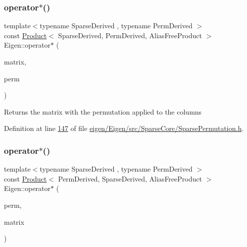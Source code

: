 \subsubsection{\texorpdfstring{operator$\ast$()}{operator*()}\hspace{0.1cm}{\footnotesize\ttfamily [1/9]}}
{\footnotesize\ttfamily template$<$typename Sparse\+Derived , typename Perm\+Derived $>$ \\
const \hyperlink{group___core___module_class_eigen_1_1_product}{Product}$<$ Sparse\+Derived, Perm\+Derived, Alias\+Free\+Product $>$ Eigen\+::operator$\ast$ (\begin{DoxyParamCaption}\item[{const \hyperlink{group___sparse_core___module_class_eigen_1_1_sparse_matrix_base}{Sparse\+Matrix\+Base}$<$ Sparse\+Derived $>$ \&}]{matrix,  }\item[{const \hyperlink{group___core___module_class_eigen_1_1_permutation_base}{Permutation\+Base}$<$ Perm\+Derived $>$ \&}]{perm }\end{DoxyParamCaption})\hspace{0.3cm}{\ttfamily [inline]}}

\begin{DoxyReturn}{Returns}
the matrix with the permutation applied to the columns 
\end{DoxyReturn}


Definition at line \hyperlink{eigen_2_eigen_2src_2_sparse_core_2_sparse_permutation_8h_source_l00147}{147} of file \hyperlink{eigen_2_eigen_2src_2_sparse_core_2_sparse_permutation_8h_source}{eigen/\+Eigen/src/\+Sparse\+Core/\+Sparse\+Permutation.\+h}.

\mbox{\label{namespace_eigen_a9c2c1af8da495ae3cbe7be12cecfe294}} 
\subsubsection{\texorpdfstring{operator$\ast$()}{operator*()}\hspace{0.1cm}{\footnotesize\ttfamily [2/9]}}
{\footnotesize\ttfamily template$<$typename Sparse\+Derived , typename Perm\+Derived $>$ \\
const \hyperlink{group___core___module_class_eigen_1_1_product}{Product}$<$ Perm\+Derived, Sparse\+Derived, Alias\+Free\+Product $>$ Eigen\+::operator$\ast$ (\begin{DoxyParamCaption}\item[{const \hyperlink{group___core___module_class_eigen_1_1_permutation_base}{Permutation\+Base}$<$ Perm\+Derived $>$ \&}]{perm,  }\item[{const \hyperlink{group___sparse_core___module_class_eigen_1_1_sparse_matrix_base}{Sparse\+Matrix\+Base}$<$ Sparse\+Derived $>$ \&}]{matrix }\end{DoxyParamCaption})\hspace{0.3cm}{\ttfamily [inline]}}

